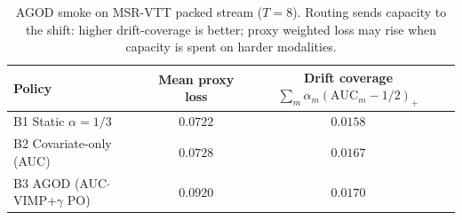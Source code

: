 
\begin{table}[ht]
\centering
\caption{AGOD smoke on MSR-VTT packed stream ($T=8$).
Routing sends capacity to the shift: higher drift-coverage is better;
proxy weighted loss may rise when capacity is spent on harder modalities.}
\label{tab:agod-smoke}
\small
\begin{tabular}{@{}l c c@{}}
\toprule
Policy & Mean proxy loss & Drift coverage $\sum_m \alpha_m(\mathrm{AUC}_m-1/2)_+$ \\
\midrule
B1 Static $\alpha=1/3$ & $0.0722$ & $0.0158$ \\
B2 Covariate-only (AUC) & $0.0728$ & $0.0167$ \\
B3 AGOD (AUC$\cdot$VIMP+$\gamma$ PO) & $0.0920$ & $0.0170$ \\
\bottomrule
\end{tabular}
\end{table}
